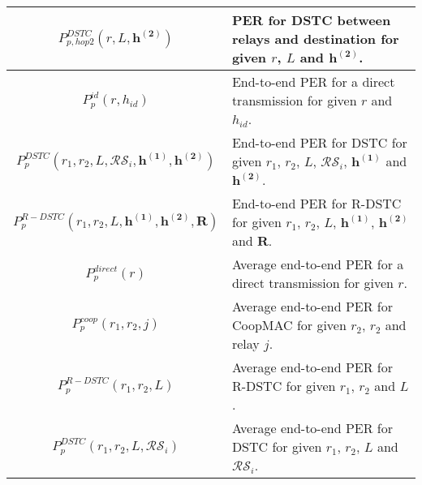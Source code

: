 \documentclass[peerreview,draftcls,onecolumn,12pt,a4paper]{IEEEtran}
\begin{document}
\begin{table}[h!]
\begin{minipage}[b]{1\linewidth}
\begin{tabular}{c||l}
 $P_{p,hop2}^{DSTC}(r, L, \mathbf{h^{(2)}})$ & PER for DSTC between relays and destination for given $r$, $L$ and $\mathbf{h^{(2)}}$. \\
\hline
$P_{p}^{id}(r, h_{id})$ & End-to-end PER for a direct transmission for given $r$ and $h_{id}$. \\
\hline
 $P_{p}^{DSTC}(r_1, r_2,L, \mathcal{RS}_i, {\mathbf{h^{(1)}}}, \mathbf{h^{(2)}})$ & End-to-end PER for DSTC for given $r_1$, $r_2$, $L$, $\mathcal{RS}_i$, ${\mathbf{h^{(1)}}}$ and $\mathbf{h^{(2)}}$. \\
\hline
 $P_{p}^{R-DSTC}(r_1, r_2,L, {\mathbf{h^{(1)}}},\mathbf{h^{(2)},R})$ & End-to-end PER for R-DSTC for given $r_1$, $r_2$, $L$, ${\mathbf{h^{(1)}}}$, $\mathbf{h^{(2)}}$ and $\mathbf{R}$. \\
\hline
$P_{p}^{direct}(r)$ & Average end-to-end PER for a direct transmission for given $r$. \\
\hline $P_{p}^{coop}(r_1, r_2,j)$ & Average end-to-end PER for
CoopMAC for given $r_2$, $r_2$ and relay $j$. \\ \hline
$P_{p}^{R-DSTC}(r_1, r_2,L)$ & Average end-to-end PER for R-DSTC for given $r_1$, $r_2$ and $L$. \\
\hline
 $P_{p}^{DSTC}(r_1, r_2,L, \mathcal{RS}_i)$ & Average end-to-end PER for DSTC for given $r_1$, $r_2$, $L$ and $\mathcal{RS}_i$. \\
\hline

\end{tabular}
\end{minipage} \\
\end{table}
\end{document}
